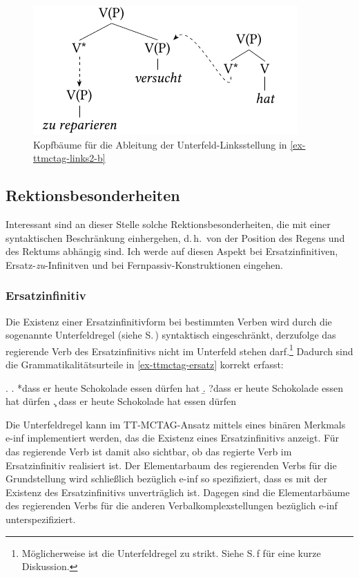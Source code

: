 \begin{figure}[t]
\centering
\includegraphics{graphics/abb719.pdf}
\caption{\label{fig-ttmctag-links2-2}Kopfbäume für die Ableitung der Unterfeld-Linksstellung in \ref{ex-ttmctag-links2-b}}
\end{figure}


\subsection{Rektionsbesonderheiten} \label{sec-ttmctag-rekt}

Interessant sind an dieser Stelle solche Rektionsbesonderheiten, die mit einer syntaktischen Beschränkung einhergehen, d.\,h.\ von der Position des Regens und des Rektums abhängig sind. Ich werde auf diesen Aspekt bei Ersatzinfinitiven, Ersatz-\emph{zu}-Infinitven und bei Fernpassiv-Konstruktionen eingehen. 

\subsubsection{Ersatzinfinitiv}

\largerpage%
Die Existenz einer Ersatzinfinitivform bei bestimmten Verben wird durch die sogenannte Unterfeldregel (siehe S.\,\pageref{ex-ufr}) syntaktisch eingeschränkt, derzufolge das regierende Verb des Ersatzinfinitivs nicht im Unterfeld stehen darf.\footnote{Möglicherweise ist die Unterfeldregel zu strikt. Siehe S.\,\pageref{ex-ufr}f für eine kurze Diskussion.} Dadurch sind die Grammatikalitätsurteile in \ref{ex-ttmctag-ersatz} korrekt erfasst:

\ex. \label{ex-ttmctag-ersatz}
\a. *dass er heute Schokolade essen dürfen hat
\b. ?dass er heute Schokolade essen hat dürfen
\c. dass er heute Schokolade hat essen dürfen

Die Unterfeldregel kann im TT-MCTAG-Ansatz mittels eines binären Merkmals {\sc e-inf} implementiert werden, das die Existenz eines Ersatzinfinitivs anzeigt. Für das regierende Verb ist damit also sichtbar, ob das regierte Verb im Ersatzinfinitiv realisiert ist. Der Elementarbaum des regierenden Verbs für die Grundstellung wird schlie\ss lich bezüglich {\sc e-inf} so spezifiziert, dass es mit der Existenz des Ersatzinfinitivs unverträglich ist. Dagegen sind die Elementarbäume des regierenden Verbs für die anderen Verbalkomplexstellungen bezüglich {\sc e-inf} unterspezifiziert.
\largerpage%

